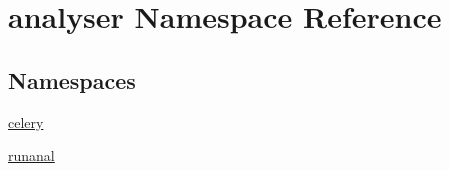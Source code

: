 \hypertarget{namespaceanalyser}{\section{analyser Namespace Reference}
\label{namespaceanalyser}
}
\subsection*{Namespaces}
\begin{DoxyCompactItemize}
\item 
\hyperlink{namespaceanalyser_1_1celery}{celery}
\item 
\hyperlink{namespaceanalyser_1_1runanal}{runanal}
\end{DoxyCompactItemize}
